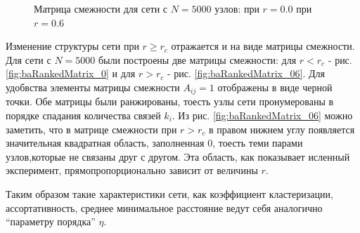 \documentclass[10pt,aps,pra]{revtex4-1}
\begin{document}
\begin{figure}[H]  

\centering
{}  

\caption{
\label{fig:baRankedMatrix}
Матрица смежности для сети с $N=5000$ узлов:
  при $r=0.0$
 при $r=0.6$
}
\end{figure}


Изменение структуры сети при $r \geq r_c$ отражается и на виде матрицы смежности. Для сети с $N=5000$ были построены две матрицы смежности: для $r<r_c$ - рис. \ref{fig:baRankedMatrix_0} и для $r>r_c$ - рис. \ref{fig:baRankedMatrix_06}. Для удобвства элементы матрицы смежности $A_{ij}=1$ отображены  в виде черной точки. Обе матрицы были ранжированы, тоесть узлы сети пронумерованы в порядке спадания количества связей $k_i$. Из рис. \ref{fig:baRankedMatrix_06} можно заметить, что в матрице смежности при $r>r_c$ в правом нижнем углу появляется значительная квадратная область, заполненная 0, тоесть теми парами узлов,которые не связаны друг с другом. Эта область, как показывает исленный эксперимент, прямопропорционально зависит от величины $r$.

Таким образом такие характеристики сети, как коэффициент кластеризации, ассортативность, среднее минимальное расстояние ведут себя аналогично ``параметру порядка'' $\eta$.
\end{document}
